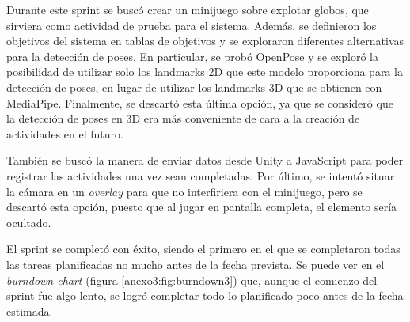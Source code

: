 Durante este sprint se buscó crear un minijuego sobre explotar globos, que sirviera como actividad
de prueba para el sistema. Además, se definieron los objetivos del sistema en tablas de objetivos
y se exploraron diferentes alternativas para la detección de poses. En particular, se probó OpenPose
y se exploró la posibilidad de utilizar solo los landmarks 2D que este modelo proporciona para la
detección de poses, en lugar de utilizar los landmarks 3D que se obtienen con MediaPipe. Finalmente,
se descartó esta última opción, ya que se consideró que la detección de poses en 3D era más conveniente
de cara a la creación de actividades en el futuro.

También se buscó la manera de enviar datos desde Unity a JavaScript para poder registrar las actividades
una vez sean completadas. Por último, se intentó situar la cámara en un \textit{overlay} para que no
interfiriera con el minijuego, pero se descartó esta opción, puesto que al jugar en pantalla completa,
el elemento sería ocultado.

El sprint se completó con éxito, siendo el primero en el que se completaron todas las tareas planificadas
no mucho antes de la fecha prevista. Se puede ver en el \textit{burndown chart} (figura \ref{anexo3:fig:burndown3})
que, aunque el comienzo del sprint fue algo lento, se logró completar todo lo planificado poco antes de
la fecha estimada.




